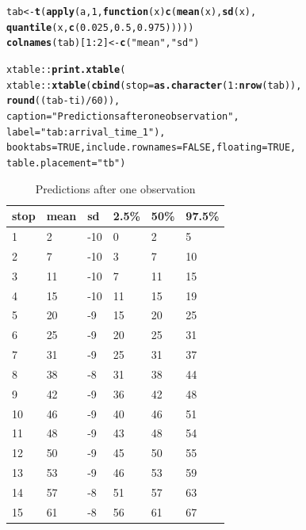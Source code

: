 \documentclass[11pt]{article}\usepackage[]{graphicx}\usepackage[]{color}
\makeatletter
\newcommand{\hlnum}[1]{\textcolor[rgb]{0.686,0.059,0.569}{#1}}%
\newcommand{\hlstr}[1]{\textcolor[rgb]{0.192,0.494,0.8}{#1}}%
\newcommand{\hlopt}[1]{\textcolor[rgb]{0,0,0}{#1}}%
\newcommand{\hlstd}[1]{\textcolor[rgb]{0.345,0.345,0.345}{#1}}%
\newcommand{\hlkwa}[1]{\textcolor[rgb]{0.161,0.373,0.58}{\textbf{#1}}}%
\newcommand{\hlkwb}[1]{\textcolor[rgb]{0.69,0.353,0.396}{#1}}%
\newcommand{\hlkwc}[1]{\textcolor[rgb]{0.333,0.667,0.333}{#1}}%
\newcommand{\hlkwd}[1]{\textcolor[rgb]{0.737,0.353,0.396}{\textbf{#1}}}%
\newenvironment{kframe}{%
 \def\at@end@of@kframe{}%
 \ifinner\ifhmode%
  \def\at@end@of@kframe{\end{minipage}}%
  \begin{minipage}{\columnwidth}%
 \fi\fi%
 \def\FrameCommand##1{\hskip\@totalleftmargin \hskip-\fboxsep
 \colorbox{shadecolor}{##1}\hskip-\fboxsep
     \hskip-\linewidth \hskip-\@totalleftmargin \hskip\columnwidth}%
 \MakeFramed {\advance\hsize-\width
   \@totalleftmargin\z@ \linewidth\hsize
   \@setminipage}}%
 {\par\unskip\endMakeFramed%
 \at@end@of@kframe}
\makeatother
\begin{document}
\begin{kframe}
\begin{alltt}
\hlstd{tab} \hlkwb{<-} \hlkwd{t}\hlstd{(}\hlkwd{apply}\hlstd{(a,} \hlnum{1}\hlstd{,} \hlkwa{function}\hlstd{(}\hlkwc{x}\hlstd{)} \hlkwd{c}\hlstd{(}\hlkwd{mean}\hlstd{(x),} \hlkwd{sd}\hlstd{(x),}
                                   \hlkwd{quantile}\hlstd{(x,} \hlkwd{c}\hlstd{(}\hlnum{0.025}\hlstd{,} \hlnum{0.5}\hlstd{,} \hlnum{0.975}\hlstd{)))))}
\hlkwd{colnames}\hlstd{(tab)[}\hlnum{1}\hlopt{:}\hlnum{2}\hlstd{]} \hlkwb{<-} \hlkwd{c}\hlstd{(}\hlstr{"mean"}\hlstd{,} \hlstr{"sd"}\hlstd{)}

\hlstd{xtable}\hlopt{::}\hlkwd{print.xtable}\hlstd{(}
    \hlstd{xtable}\hlopt{::}\hlkwd{xtable}\hlstd{(}\hlkwd{cbind}\hlstd{(}\hlkwc{stop} \hlstd{=} \hlkwd{as.character}\hlstd{(}\hlnum{1}\hlopt{:}\hlkwd{nrow}\hlstd{(tab)),}
                         \hlkwd{round}\hlstd{((tab} \hlopt{-} \hlstd{ti)} \hlopt{/} \hlnum{60}\hlstd{)),}
                   \hlkwc{caption} \hlstd{=} \hlstr{"Predictions after one observation"}\hlstd{,}
                   \hlkwc{label} \hlstd{=} \hlstr{"tab:arrival_time_1"}\hlstd{),}
    \hlkwc{booktabs} \hlstd{=} \hlnum{TRUE}\hlstd{,} \hlkwc{include.rownames} \hlstd{=} \hlnum{FALSE}\hlstd{,} \hlkwc{floating} \hlstd{=} \hlnum{TRUE}\hlstd{,}
    \hlkwc{table.placement} \hlstd{=} \hlstr{"tb"}\hlstd{)}
\end{alltt}
\end{kframe}%
\begin{table}[tb]
\centering
\begin{tabular}{llllll}
  \toprule
stop & mean & sd & 2.5\% & 50\% & 97.5\% \\ 
  \midrule
1 & 2 & -10 & 0 & 2 & 5 \\ 
  2 & 7 & -10 & 3 & 7 & 10 \\ 
  3 & 11 & -10 & 7 & 11 & 15 \\ 
  4 & 15 & -10 & 11 & 15 & 19 \\ 
  5 & 20 & -9 & 15 & 20 & 25 \\ 
  6 & 25 & -9 & 20 & 25 & 31 \\ 
  7 & 31 & -9 & 25 & 31 & 37 \\ 
  8 & 38 & -8 & 31 & 38 & 44 \\ 
  9 & 42 & -9 & 36 & 42 & 48 \\ 
  10 & 46 & -9 & 40 & 46 & 51 \\ 
  11 & 48 & -9 & 43 & 48 & 54 \\ 
  12 & 50 & -9 & 45 & 50 & 55 \\ 
  13 & 53 & -9 & 46 & 53 & 59 \\ 
  14 & 57 & -8 & 51 & 57 & 63 \\ 
  15 & 61 & -8 & 56 & 61 & 67 \\ 
   \bottomrule
\end{tabular}
\caption{Predictions after one observation} 
\label{tab:arrival_time_1}
\end{table}
\end{document}
